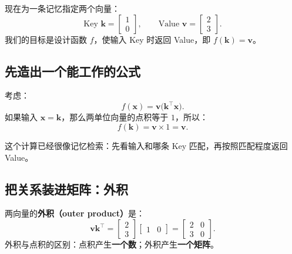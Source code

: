 \documentclass[11pt,a4paper,UTF8]{ctexart}
\numberwithin{equation}{section}
\newcommand{\vect}[1]{\boldsymbol{#1}}
\begin{document}
现在为一条记忆指定两个向量：
\[
\text{Key }\vect{k}=\begin{bmatrix}1\\0\end{bmatrix},\qquad
\text{Value }\vect{v}=\begin{bmatrix}2\\3\end{bmatrix}.
\]
我们的目标是设计函数 $f$，使输入 Key 时返回 Value，即 $f(\vect{k})=\vect{v}$。

\subsection{先造出一个能工作的公式}
考虑：
\begin{equation}
\boxed{f(\vect{x})=\vect{v}\bigl(\vect{k}^\top\vect{x}\bigr).}
\end{equation}
如果输入 $\vect{x}=\vect{k}$，那么两单位向量的点积等于 $1$，所以：
\[
f(\vect{k})=\vect{v}\times 1=\vect{v}.
\]

\begin{center}
\end{center}

这个计算已经很像记忆检索：先看输入和哪条 Key 匹配，再按照匹配程度返回 Value。

\subsection{把关系装进矩阵：外积}
两向量的\textbf{外积（outer product）}是：
\begin{equation}
\vect{v}\vect{k}^\top=
\begin{bmatrix}2\\3\end{bmatrix}
\begin{bmatrix}1&0\end{bmatrix}
=\begin{bmatrix}2&0\\3&0\end{bmatrix}.
\end{equation}
外积与点积的区别：点积产生\textbf{一个数}；外积产生\textbf{一个矩阵}。
\end{document}
